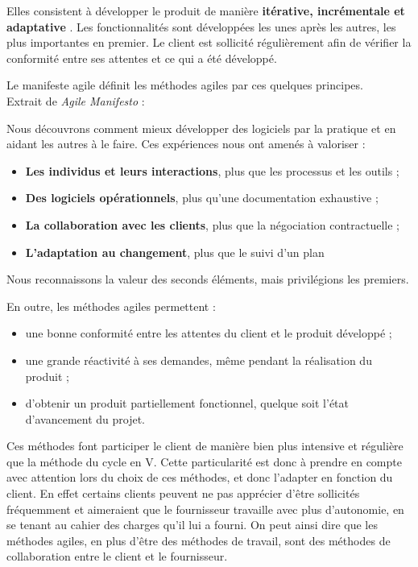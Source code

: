 Elles consistent à développer le produit de manière \textbf{itérative, incrémentale et adaptative} . Les fonctionnalités sont développées les unes après les autres, les plus importantes en premier. Le client est sollicité régulièrement afin de vérifier la conformité entre ses attentes et ce qui a été développé.

Le manifeste agile  définit les méthodes agiles par ces quelques principes.\\

Extrait de \textit{Agile Manifesto} :

\begin{Quote}
Nous découvrons comment mieux développer des logiciels par la pratique et en aidant les autres à le faire.
Ces expériences nous ont amenés à valoriser :

\begin{itemize}
\item \textbf{Les individus et leurs interactions}, plus que les processus et les outils ;
\item \textbf{Des logiciels opérationnels}, plus qu’une documentation exhaustive ;
\item \textbf{La collaboration avec les clients}, plus que la négociation contractuelle ;
\item \textbf{L’adaptation au changement}, plus que le suivi d’un plan
\end{itemize}

Nous reconnaissons la valeur des seconds éléments, mais privilégions les premiers.
\end{Quote}


En outre, les méthodes agiles permettent :

\begin{itemize}
\item une bonne conformité entre les attentes du client et le produit développé ;
\item une grande réactivité à ses demandes, même pendant la réalisation du produit ;
\item d'obtenir un produit partiellement fonctionnel, quelque soit l'état d'avancement du projet.
\end{itemize}

Ces méthodes font participer le client de manière bien plus intensive et régulière que la méthode du cycle en V. Cette particularité est donc à prendre en compte avec attention lors du choix de ces méthodes, et donc l'adapter en fonction du client. En effet certains clients peuvent ne pas apprécier d'être sollicités fréquemment et aimeraient que le fournisseur travaille avec plus d'autonomie, en se tenant au cahier des charges qu'il lui a fourni. On peut ainsi dire que les méthodes agiles, en plus d'être des méthodes de travail, sont des méthodes de collaboration entre le client et le fournisseur.

